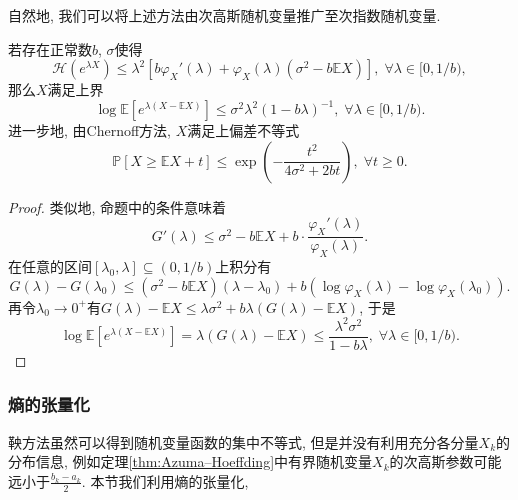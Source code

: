 自然地, 我们可以将上述方法由次高斯随机变量推广至次指数随机变量. 
\begin{proposition}[Bernstein熵的界]\label{thm:BernsteinEntropyBd}
	若存在正常数$b$, $\sigma$使得
	\begin{equation*}
		\mathcal{H}(e^{\lambda X}) 
		\leq \lambda^2 \left[ b \varphi_X'(\lambda) + \varphi_X(\lambda)(\sigma^2 - b \mathbb{E}X) \right],\;
		\forall \lambda \in [0, 1/b), 
	\end{equation*}
	那么$X$满足上界
	\begin{equation*}
		\log \mathbb{E}\left[ e^{\lambda(X - \mathbb{E}X)}\right] 
		\leq \sigma^2 \lambda^2 (1 - b \lambda)^{-1},\; 
		\forall \lambda \in [0, 1/b). 
	\end{equation*}
	进一步地, 由Chernoff方法, $X$满足上偏差不等式
	\begin{equation*}
		\mathbb{P}[X \geq \mathbb{E}X + t] 
		\leq \exp \left(- \frac{t^2}{4 \sigma^2 + 2b t} \right),\;
		\forall t \geq 0. 
	\end{equation*}
\end{proposition}
\begin{proof}
	类似地, 命题中的条件意味着
	\begin{equation*}
		G'(\lambda) 
		\leq \sigma^2 - b \mathbb{E}X + b \cdot \frac{\varphi_X'(\lambda)}{\varphi_X(\lambda)}. 
	\end{equation*}
	在任意的区间$[\lambda_0, \lambda] \subseteq (0, 1/b)$上积分有
	\begin{equation*}
		G(\lambda) - G(\lambda_0) 
		\leq (\sigma^2 - b \mathbb{E}X)(\lambda - \lambda_0) + b(\log \varphi_X(\lambda) - \log \varphi_X(\lambda_0)). 
	\end{equation*}
	再令$\lambda_0 \to 0^+$有$G(\lambda) - \mathbb{E}X \leq \lambda \sigma^2 + b \lambda (G(\lambda) - \mathbb{E}X)$, 于是
	\begin{equation*}
		\log \mathbb{E}\left[e^{\lambda(X - \mathbb{E}X)}\right]
		= \lambda(G(\lambda) - \mathbb{E}X)
		\leq \frac{\lambda^2 \sigma^2}{1 - b \lambda} ,\; 
		\forall \lambda \in [0, 1/b). 
	\end{equation*}
\end{proof}

\subsubsection{熵的张量化}

鞅方法虽然可以得到随机变量函数的集中不等式, 但是并没有利用充分各分量$X_k$的分布信息, 例如定理\ref{thm:Azuma–Hoeffding}中有界随机变量$X_k$的次高斯参数可能远小于$\frac{b_k - a_k}{2}$. 
本节我们利用熵的张量化, 

